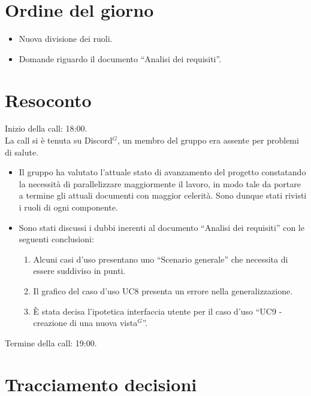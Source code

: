 \section{Ordine del giorno}

\begin{itemize}
	\item Nuova divisione dei ruoli.
	\item Domande riguardo il documento ``Analisi dei requisiti''.
\end{itemize}

\section{Resoconto}
\label{sec:Resoconto}

\noindent 
Inizio della call: 18:00. \\
\noindent La call si è tenuta su Discord$^{G}$, un membro del gruppo era assente per problemi di salute.
\begin{itemize}
	\item Il gruppo ha valutato l'attuale stato di avanzamento del progetto constatando la necessità di parallelizzare maggiormente il lavoro, in modo tale da portare a termine gli attuali documenti con maggior celerità. Sono dunque stati rivisti i ruoli di ogni componente.
	\item Sono stati discussi i dubbi inerenti al documento ``Analisi dei requisiti'' con le seguenti conclusioni:
		\begin{enumerate}
			\item Alcuni casi d'uso presentano uno ``Scenario generale'' che necessita di essere suddiviso in punti.
			\item Il grafico del caso d'uso UC8 presenta un errore nella generalizzazione.
			\item È stata decisa l'ipotetica interfaccia utente per il caso d'uso ``UC9 - creazione di una nuova vista$^{G}$''.
		\end{enumerate}
\end{itemize}

\noindent Termine della call: 19:00.

\section{Tracciamento decisioni}

